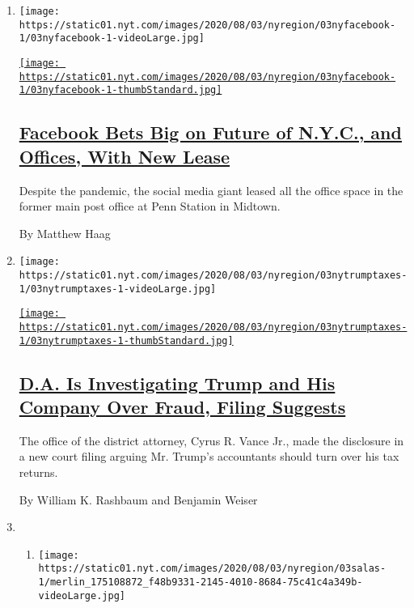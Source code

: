 \begin{enumerate}
\def\labelenumi{\arabic{enumi}.}
\item
  \texttt{[image: https://static01.nyt.com/images/2020/08/03/nyregion/03nyfacebook-1/03nyfacebook-1-videoLarge.jpg]}

  \href{/2020/08/03/nyregion/facebook-nyc-office-farley-building.html}{\texttt{[image: https://static01.nyt.com/images/2020/08/03/nyregion/03nyfacebook-1/03nyfacebook-1-thumbStandard.jpg]}}

  \hypertarget{facebook-bets-big-on-future-of-nyc-and-offices-with-new-lease}{%
  \subsection{\texorpdfstring{\href{/2020/08/03/nyregion/facebook-nyc-office-farley-building.html}{Facebook
  Bets Big on Future of N.Y.C., and Offices, With New
  Lease}}{Facebook Bets Big on Future of N.Y.C., and Offices, With New Lease}}\label{facebook-bets-big-on-future-of-nyc-and-offices-with-new-lease}}

  Despite the pandemic, the social media giant leased all the office
  space in the former main post office at Penn Station in Midtown.

  By Matthew Haag
\item
  \texttt{[image: https://static01.nyt.com/images/2020/08/03/nyregion/03nytrumptaxes-1/03nytrumptaxes-1-videoLarge.jpg]}

  \href{/2020/08/03/nyregion/donald-trump-taxes-cyrus-vance.html}{\texttt{[image: https://static01.nyt.com/images/2020/08/03/nyregion/03nytrumptaxes-1/03nytrumptaxes-1-thumbStandard.jpg]}}

  \hypertarget{da-is-investigating-trump-and-his-company-over-fraud-filing-suggests}{%
  \subsection{\texorpdfstring{\href{/2020/08/03/nyregion/donald-trump-taxes-cyrus-vance.html}{D.A.
  Is Investigating Trump and His Company Over Fraud, Filing
  Suggests}}{D.A. Is Investigating Trump and His Company Over Fraud, Filing Suggests}}\label{da-is-investigating-trump-and-his-company-over-fraud-filing-suggests}}

  The office of the district attorney, Cyrus R. Vance Jr., made the
  disclosure in a new court filing arguing Mr. Trump's accountants
  should turn over his tax returns.

  By William K. Rashbaum and Benjamin Weiser
\item
  \begin{enumerate}
  \def\labelenumii{\arabic{enumii}.}
  \item
    \texttt{[image: https://static01.nyt.com/images/2020/08/03/nyregion/03salas-1/merlin\_175108872\_f48b9331-2145-4010-8684-75c41c4a349b-videoLarge.jpg]}


\end{enumerate}
\end{enumerate}
